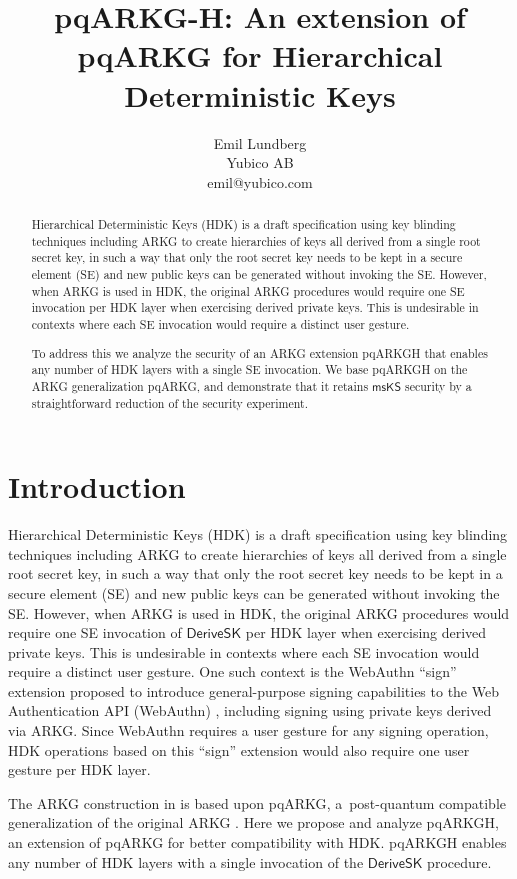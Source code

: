 \documentclass[a4paper,11pt]{article}
\author{Emil Lundberg\\Yubico AB\\emil@yubico.com}
\title{pqARKG-H: An extension of pqARKG for Hierarchical Deterministic Keys}
\newcommand{\ALGNAME}{pqARKG\babelhyphen{nobreak}H\xspace}
\newcommand{\ALGBASE}{pqARKG\xspace}
\newcommand{\msks}{\ensuremath{\mathsf{msKS}}\xspace}
\newcommand{\algname}[1]{\ensuremath{\mathsf{#1}}\xspace}
\newcommand{\algdsk}{\algname{DeriveSK}}
\begin{document}
\maketitle

\begin{abstract}
Hierarchical Deterministic Keys (HDK) is a draft specification
using key blinding techniques including ARKG
to create hierarchies of keys all derived from a single root secret key,
in such a way that only the root secret key needs to be kept in a secure element (SE)
and new public keys can be generated without invoking the SE.
However, when ARKG is used in HDK, the original ARKG procedures
would require one SE invocation per HDK layer when exercising derived private keys.
This is undesirable in contexts where each SE invocation would require a distinct user gesture.

To address this we analyze the security of an ARKG extension \ALGNAME
that enables any number of HDK layers with a single SE invocation.
We base \ALGNAME on the ARKG generalization \ALGBASE,
and demonstrate that it retains \msks security
by a straightforward reduction of the security experiment.
\end{abstract}


\section{Introduction}
Hierarchical Deterministic Keys (HDK) \cite{HDK} is a draft specification
using key blinding techniques including ARKG \cite{ARKG}
to create hierarchies of keys all derived from a single root secret key,
in such a way that only the root secret key needs to be kept in a secure element (SE)
and new public keys can be generated without invoking the SE.
However, when ARKG is used in HDK, the original ARKG procedures
would require one SE invocation of \algdsk per HDK layer when exercising derived private keys.
This is undesirable in contexts where each SE invocation would require a distinct user gesture.
One such context is the WebAuthn ``sign'' extension \cite{webauthn-sign}
proposed to introduce general-purpose signing capabilities to the Web Authentication API (WebAuthn) \cite{webauthn},
including signing using private keys derived via ARKG.
Since WebAuthn requires a user gesture for any signing operation,
HDK operations based on this ``sign'' extension would also require one user gesture per HDK layer.

The ARKG construction in \cite{ARKG} is based upon \ALGBASE \cite{Wilson},
a~post-quantum compatible generalization of the original ARKG \cite{Frymann2020}.
Here we propose and analyze \ALGNAME, an extension of pqARKG for better compatibility with HDK.
\ALGNAME enables any number of HDK layers with a single invocation of the \algdsk procedure.
\end{document}
